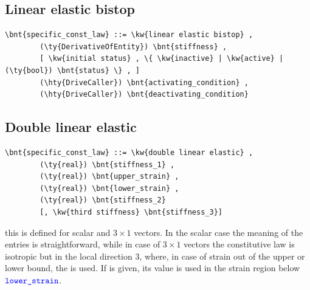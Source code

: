 \subsection{Linear elastic bistop}
\begin{Verbatim}[commandchars=\\\{\}]
    \bnt{specific_const_law} ::= \kw{linear elastic bistop} ,
        (\ty{DerivativeOfEntity}) \bnt{stiffness} ,
        [ \kw{initial status} , \{ \kw{inactive} | \kw{active} | (\ty{bool}) \bnt{status} \} , ]
        (\hty{DriveCaller}) \bnt{activating_condition} ,
        (\hty{DriveCaller}) \bnt{deactivating_condition}
\end{Verbatim}
  
\subsection{Double linear elastic}
\begin{Verbatim}[commandchars=\\\{\}]
    \bnt{specific_const_law} ::= \kw{double linear elastic} ,
        (\ty{real}) \bnt{stiffness_1} ,
        (\ty{real}) \bnt{upper_strain} ,
        (\ty{real}) \bnt{lower_strain} ,
        (\ty{real}) \bnt{stiffness_2}
        [, \kw{third stiffness} \bnt{stiffness_3}]
\end{Verbatim}
this is defined for scalar and $3 \times 1$ vectors. In the scalar case the
meaning of the entries is straightforward,
while in case of $3 \times 1$ vectors the constitutive law is isotropic
but in the local direction 3, where, in case of strain
out of the upper or lower bound, the  is used.
If  is given, its value is used in the strain region 
below $\textcolor{blue}{\texttt{lower\_strain}}$.
